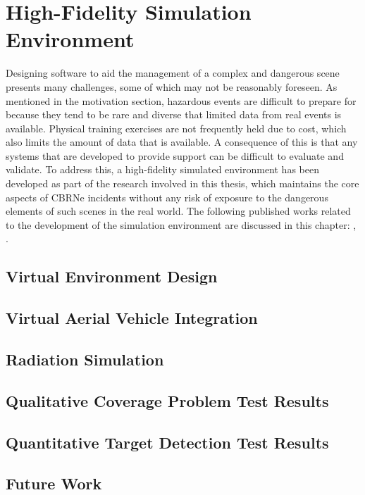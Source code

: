 \chapter{High-Fidelity Simulation Environment}
\placeholder{}
Designing software to aid the management of a complex and dangerous scene presents many challenges, some of which may not be reasonably foreseen. As mentioned in the motivation section, hazardous events are difficult to prepare for because they tend to be rare and diverse that limited data from real events is available. Physical training exercises are not frequently held due to cost, which also limits the amount of data that is available. A consequence of this is that any systems that are developed to provide support can be difficult to evaluate and validate. To address this, a high-fidelity simulated environment has been developed as part of the research involved in this thesis, which maintains the core aspects of CBRNe incidents without any risk of exposure to the dangerous elements of such scenes in the real world. The following published works related to the development of the simulation environment are discussed in this chapter: \cite{Smyth2017AInvestigation}, \cite{GEMDavidSmyth}.\par


\section{Virtual Environment Design}


\section{Virtual Aerial Vehicle Integration}


\section{Radiation Simulation}

\section{Qualitative Coverage Problem Test Results}

\section{Quantitative Target Detection Test Results}

\section{Future Work}